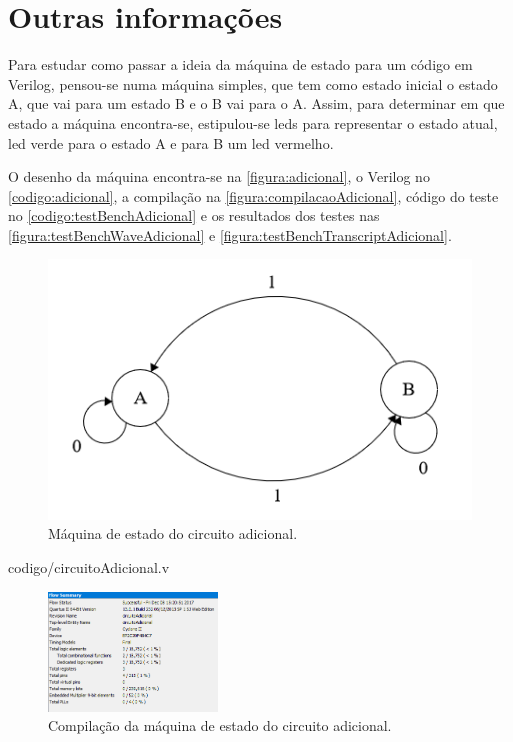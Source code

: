 \chapter{Outras informações}
	Para estudar como passar a ideia da máquina de estado para um código em
	Verilog, pensou-se numa máquina simples, que tem como estado inicial o estado A,
	que vai para um estado B e o B vai para o A. Assim, para determinar em que estado
	a máquina encontra-se, estipulou-se \ac{led}s para representar o estado atual,
	\ac{led} verde para o estado A e para B um \ac{led} vermelho.

	O desenho da máquina encontra-se na \autoref{figura:adicional},
	o Verilog no \autoref{codigo:adicional}, a compilação na
	\autoref{figura:compilacaoAdicional}, código do teste
	no \autoref{codigo:testBenchAdicional} e os resultados dos testes nas
	\autoref{figura:testBenchWaveAdicional} e \autoref{figura:testBenchTranscriptAdicional}.

	\begin{figure}[H]
		\includegraphics{img/maquinaAdicional/maquinaEstado}
		\caption{Máquina de estado do circuito adicional.}
		\label{figura:adicional}
	\end{figure}

	
	{codigo/circuitoAdicional.v}

	\begin{figure}[H]
		\centering
		\includegraphics[width=0.4\textwidth]{img/maquinaAdicional/compilacao}
		\caption{Compilação da máquina de estado do circuito adicional.}
		\label{figura:compilacaoAdicional}
	\end{figure}

